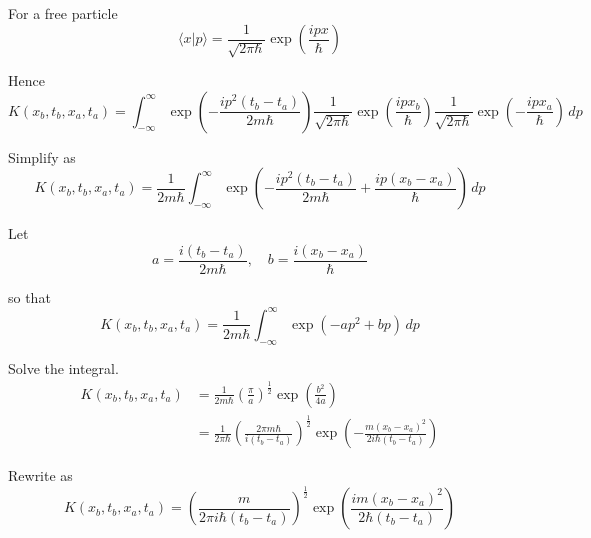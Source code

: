 For a free particle
\begin{equation*}
\langle x|p\rangle=\frac{1}{\sqrt{2\pi\hbar}}\exp\left(\frac{ipx}{\hbar}\right)
\end{equation*}

Hence
\begin{equation*}
K(x_b,t_b,x_a,t_a)=\int_{-\infty}^\infty
\exp\left(-\frac{ip^2(t_b-t_a)}{2m\hbar}\right)
\frac{1}{\sqrt{2\pi\hbar}}\exp\left(\frac{ipx_b}{\hbar}\right)
\frac{1}{\sqrt{2\pi\hbar}}\exp\left(-\frac{ipx_a}{\hbar}\right)\,dp
\end{equation*}

Simplify as
\begin{equation*}
K(x_b,t_b,x_a,t_a)=\frac{1}{2m\hbar}\int_{-\infty}^\infty
\exp\left(-\frac{ip^2(t_b-t_a)}{2m\hbar}+\frac{ip(x_b-x_a)}{\hbar}\right)\,dp
\end{equation*}

Let
\begin{equation*}
a=\frac{i(t_b-t_a)}{2m\hbar},\quad b=\frac{i(x_b-x_a)}{\hbar}
\end{equation*}

so that
\begin{equation*}
K(x_b,t_b,x_a,t_a)=\frac{1}{2m\hbar}\int_{-\infty}^\infty
\exp\left(-ap^2+bp\right)\,dp
\end{equation*}

Solve the integral.
\begin{align*}
K(x_b,t_b,x_a,t_a)
&=\frac{1}{2m\hbar}\left(\frac{\pi}{a}\right)^\frac{1}{2}\exp\left(\frac{b^2}{4a}\right)
\\
&=\frac{1}{2\pi\hbar}
\left(\frac{2\pi m\hbar}{i(t_b-t_a)}\right)^\frac{1}{2}
\exp\left(-\frac{m(x_b-x_a)^2}{2i\hbar(t_b-t_a)}\right)
\end{align*}

Rewrite as
\begin{equation*}
K(x_b,t_b,x_a,t_a)=
\left(\frac{m}{2\pi i\hbar(t_b-t_a)}\right)^\frac{1}{2}
\exp\left(\frac{im(x_b-x_a)^2}{2\hbar(t_b-t_a)}\right)
\tag{3}
\end{equation*}


